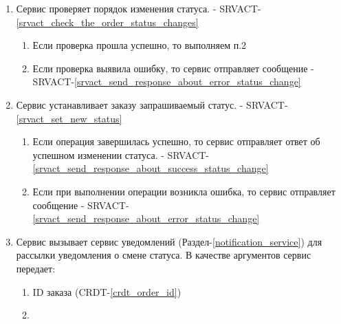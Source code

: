     \begin{alg} \label{alg_order_status_processing} \mbox{}

         \begin{enumerate}

            \item Сервис проверяет порядок изменения статуса. - SRVACT-\ref{srvact_check_the_order_status_changes}

             	\begin{enumerate}

               	\item Если проверка прошла успешно, то выполняем п.2
            
             		\item Если проверка выявила ошибку, то сервис отправляет сообщение - SRVACT-\ref{srvact_send_response_about_error_status_change}

             	\end{enumerate}

            \item Сервис устанавливает заказу запрашиваемый статус. - SRVACT-\ref{srvact_set_new_status}

             	\begin{enumerate}

               	\item Если операция завершилась успешно, то сервис отправляет ответ об успешном изменении статуса. - SRVACT-\ref{srvact_send_response_about_success_status_change}
            
             		\item Если при выполнении операции возникла ошибка, то сервис отправляет сообщение - SRVACT-\ref{srvact_send_response_about_error_status_change}

             	\end{enumerate}

            \item Сервис вызывает сервис уведомлений (Раздел-\ref{notification_service}) для рассылки уведомления о смене статуса. В качестве аргументов сервис передает: 


              \begin{enumerate}

                \item ID заказа (CRDT-\ref{crdt_order_id})
                
                \item 

              \end{enumerate}

         \end{enumerate}

         \end{alg}

